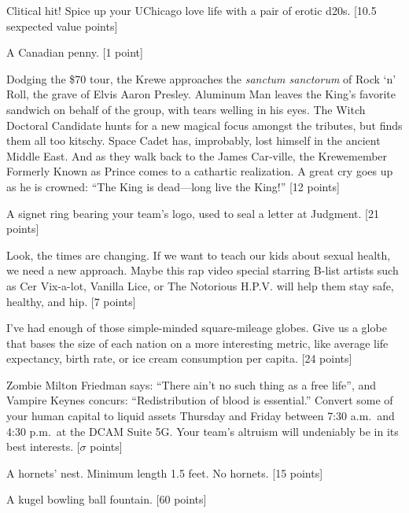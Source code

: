 \documentclass{book}
\begin{document}
\begin{list}{}{}
\item Clitical hit! Spice up your UChicago love life with a pair of erotic d20s. [10.5 sexpected value points]

\item A Canadian penny. [1 point]

\item Dodging the \$70 tour, the Krewe approaches the \emph{sanctum sanctorum} of Rock `n' Roll, the grave of Elvis Aaron Presley. Aluminum Man leaves the King's favorite sandwich on behalf of the group, with tears welling in his eyes. The Witch Doctoral Candidate hunts for a new magical focus amongst the tributes, but finds them all too kitschy. Space Cadet has, improbably, lost himself in the ancient Middle East. And as they walk back to the James Car-ville, the Krewemember Formerly Known as Prince comes to a cathartic realization. A great cry goes up as he is crowned: ``The King is dead---long live the King!'' [12 points] 

\item A signet ring bearing your team's logo, used to seal a letter at Judgment. [21 points]

\item Look, the times are changing. If we want to teach our kids about sexual health, we need a new approach. Maybe this rap video special starring B-list artists such as Cer Vix-a-lot, Vanilla Lice, or The Notorious H.P.V. will help them stay safe, healthy, and hip. [7 points]

\item I've had enough of those simple-minded square-mileage globes. Give us a globe that bases the size of each nation on a more interesting metric, like average life expectancy, birth rate, or ice cream consumption per capita. [24 points]

\item Zombie Milton Friedman says: ``There ain't no such thing as a free life'', and Vampire Keynes concurs: ``Redistribution of blood is essential.'' Convert some of your human capital to liquid assets Thursday and Friday between 7:30 a.m.\ and 4:30 p.m.\ at the DCAM Suite 5G.  Your team's altruism will undeniably be in its best interests. [$\sigma$ points] 

\item A hornets' nest. Minimum length 1.5 feet. No hornets. [15 points]


\newpage



\item A kugel bowling ball fountain. [60 points]


\end{list}
\end{document}
